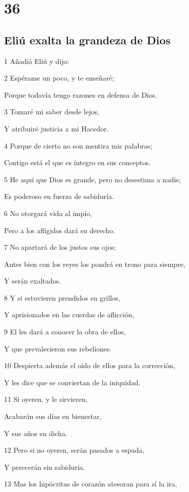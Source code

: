 \chapter{36}

\section*{Eliú exalta la grandeza de Dios}

\par 1 Añadió Eliú y dijo:
\par 2 Espérame un poco, y te enseñaré;
\par Porque todavía tengo razones en defensa de Dios. 
\par 3 Tomaré mi saber desde lejos,
\par Y atribuiré justicia a mi Hacedor.
\par 4 Porque de cierto no son mentira mis palabras;
\par Contigo está el que es íntegro en sus conceptos.
\par 5 He aquí que Dios es grande, pero no desestima a nadie;
\par Es poderoso en fuerza de sabiduría.
\par 6 No otorgará vida al impío,
\par Pero a los afligidos dará su derecho.
\par 7 No apartará de los justos sus ojos;
\par Antes bien con los reyes los pondrá en trono para siempre,
\par Y serán exaltados.
\par 8 Y si estuvieren prendidos en grillos,
\par Y aprisionados en las cuerdas de aflicción,
\par 9 El les dará a conocer la obra de ellos,
\par Y que prevalecieron sus rebeliones. 
\par 10 Despierta además el oído de ellos para la corrección,
\par Y les dice que se conviertan de la iniquidad.
\par 11 Si oyeren, y le sirvieren,
\par Acabarán sus días en bienestar,
\par Y sus años en dicha.
\par 12 Pero si no oyeren, serán pasados a espada,
\par Y perecerán sin sabiduría.
\par 13 Mas los hipócritas de corazón atesoran para sí la ira,
